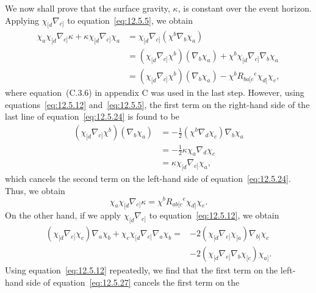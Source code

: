 We now shall prove that the surface gravity, \(\kappa\), is constant over the event
horizon. Applying \(\chi_{[d}\nabla_{c]}\) to equation~\eqref{eq:12.5.5}, we obtain
\begin{equation}
\begin{aligned}
 \chi_a\chi_{[d}\nabla_{c]}\kappa+\kappa\chi_{[d}\nabla_{c]}\chi_a
 &=\chi_{[d}\nabla_{c]}(\chi^b\nabla_b\chi_a)\\
 &=(\chi_{[d}\nabla_{c]}\chi^b)(\nabla_b\chi_a)
   +\chi^b\chi_{[d}\nabla_{c]}\nabla_b\chi_a\\
 &=(\chi_{[d}\nabla_{c]}\chi^b)(\nabla_b\chi_a)
   -\chi^bR_{ba[c}{}^e\chi_{d]}\chi_e ,
\end{aligned}
\tag{12.5.24}\label{eq:12.5.24}
\end{equation}
where equation~(C.3.6) in appendix C was used in the last step. However, using
equations~\eqref{eq:12.5.12} and~\eqref{eq:12.5.5}, the first term on the right-hand
side of the last line of equation~\eqref{eq:12.5.24} is found to be
\begin{equation}
\begin{aligned}
 (\chi_{[d}\nabla_{c]}\chi^b)(\nabla_b\chi_a)
 &=-\frac12(\chi^b\nabla_d\chi_c)\nabla_b\chi_a\\
 &=-\frac12\kappa\chi_a\nabla_d\chi_c\\
 &=\kappa\chi_{[d}\nabla_{c]}\chi_a ,
\end{aligned}
\tag{12.5.25}\label{eq:12.5.25}
\end{equation}
which cancels the second term on the left-hand side of equation~\eqref{eq:12.5.24}.
Thus, we obtain
\begin{equation}
 \chi_a\chi_{[d}\nabla_{c]}\kappa
 =\chi^bR_{ab[c}{}^e\chi_{d]}\chi_e .
 \tag{12.5.26}\label{eq:12.5.26}
\end{equation}
On the other hand, if we apply \(\chi_{[d}\nabla_{e]}\) to
equation~\eqref{eq:12.5.12}, we obtain
\begin{equation}
\begin{aligned}
 (\chi_{[d}\nabla_{e]}\chi_c)\nabla_a\chi_b
 +\chi_c\chi_{[d}\nabla_{e]}\nabla_a\chi_b
 ={}&-2(\chi_{[d}\nabla_{e]}\chi_{[a})\nabla_{b]}\chi_c\\
 &-2(\chi_{[d}\nabla_{e]}\nabla_b\chi_{[c})\chi_{a]} .
\end{aligned}
\tag{12.5.27}\label{eq:12.5.27}
\end{equation}
Using equation~\eqref{eq:12.5.12} repeatedly, we find that the first term on the
left-hand side of equation~\eqref{eq:12.5.27} cancels the first term on the
